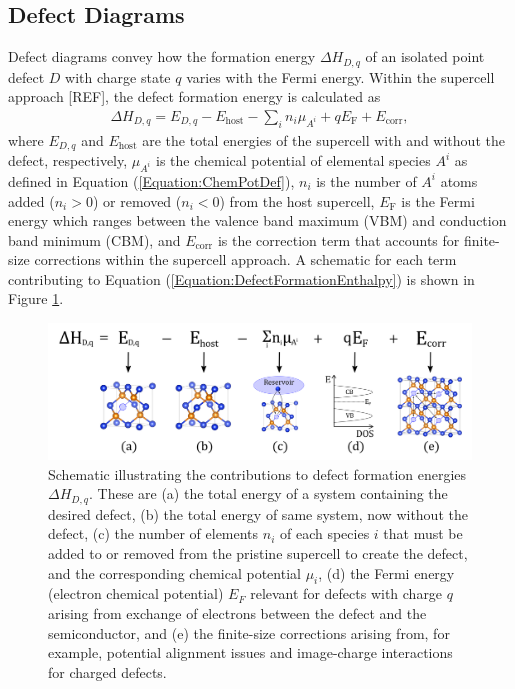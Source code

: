 \documentclass[%
 reprint,
 amsmath,amssymb,
 aps,
]{revtex4-1}
\begin{document}
\subsection{Defect Diagrams}
Defect diagrams convey how the formation energy $\Delta H_{D,q}$ of an isolated point defect $D$ with charge state $q$ varies with the Fermi energy. Within the supercell approach [REF], the defect formation energy is calculated as
\begin{align} \label{Equation:DefectFormationEnthalpy}
\Delta H_{D,q} = E_{D,q} - E_{\text{host}} - \sum_{i} n_i \mu_{A^i} + q E_{\text{F}} + E_{\text{corr}},
\end{align}
where $E_{D,q}$ and $E_{\text{host}}$ are the total energies of the supercell with and without the defect, respectively, $\mu_{A^i}$ is the chemical potential of elemental species $A^i$ as defined in Equation (\ref{Equation:ChemPotDef}), $n_i$ is the number of $A^i$ atoms added ($n_i > 0$) or removed ($n_i < 0$) from the host supercell, $E_{\text{F}}$ is the Fermi energy which ranges between the valence band maximum (VBM) and conduction band minimum (CBM), and $E_{\text{corr}}$ is the correction term that accounts for finite-size corrections within the supercell approach. A schematic for each term contributing to Equation (\ref{Equation:DefectFormationEnthalpy}) is shown in Figure \ref{Figure:DefectFormation}.

\begin{figure}[ht]
\centering
\includegraphics[width=\textwidth]{DefectFormation.pdf}
\caption{Schematic illustrating the contributions to defect formation energies $\Delta H_{D,q}$. These are (a) the total energy of a system containing the desired defect, (b) the total energy of same system, now without the defect, (c) the number of elements $n_i$ of each species $i$ that must be added to or removed from the pristine supercell to create the defect, and the corresponding chemical potential $\mu_i$, (d) the Fermi energy (electron chemical potential) $E_F$ relevant for defects with charge $q$ arising from exchange of electrons between the defect and the semiconductor, and (e) the finite-size corrections arising from, for example, potential alignment issues and image-charge interactions for charged defects.}
\label{Figure:DefectFormation}
\end{figure}
\end{document}
